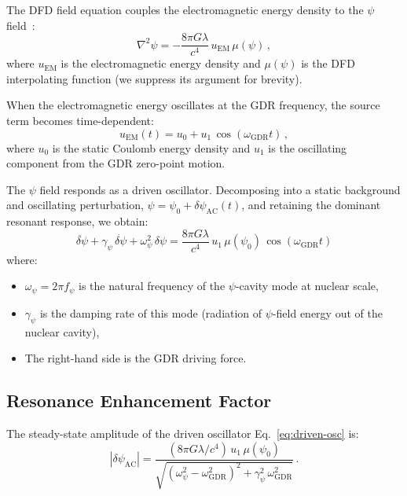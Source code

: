 \documentclass[aps,prd,twocolumn,superscriptaddress,nofootinbib]{revtex4-2}
\newcommand{\mufunction}{\mu}
\newcommand{\lam}{\lambda}
\newcommand{\wGDR}{\omega_{\mathrm{GDR}}}
\newcommand{\wpsi}{\omega_\psi}
\newcommand{\gpsi}{\gamma_\psi}
\newcommand{\fpsi}{f_\psi}
\begin{document}
The DFD field equation couples the electromagnetic energy density
to the $\psi$ field~\cite{Alcock2026Core}:
\begin{equation}\label{eq:field-eq}
\nabla^2\psi = -\frac{8\pi G\lam}{c^4}\,u_{\mathrm{EM}}\,
\mufunction(\psi)\,,
\end{equation}
where $u_{\mathrm{EM}}$ is the electromagnetic energy density and
$\mufunction(\psi)$ is the DFD interpolating function (we suppress
its argument for brevity).

When the electromagnetic energy oscillates at the GDR frequency, the
source term becomes time-dependent:
\begin{equation}\label{eq:uem-osc}
u_{\mathrm{EM}}(t) = u_0 + u_1\,\cos(\wGDR t)\,,
\end{equation}
where $u_0$ is the static Coulomb energy density and $u_1$ is the
oscillating component from the GDR zero-point motion.

The $\psi$ field responds as a driven oscillator.  Decomposing into
a static background and oscillating perturbation,
$\psi = \psi_0 + \delta\psi_{\mathrm{AC}}(t)$, and retaining the
dominant resonant response, we obtain:
\begin{equation}\label{eq:driven-osc}
\boxed{
\ddot{\delta\psi} + \gpsi\,\dot{\delta\psi} + \wpsi^2\,\delta\psi
= \frac{8\pi G\lam}{c^4}\,u_1\,\mufunction(\psi_0)\,
\cos(\wGDR t)
}
\end{equation}
where:
\begin{itemize}[nosep]
\item $\wpsi = 2\pi\fpsi$ is the natural frequency of the
$\psi$-cavity mode at nuclear scale,
\item $\gpsi$ is the damping rate of this mode (radiation of
$\psi$-field energy out of the nuclear cavity),
\item The right-hand side is the GDR driving force.
\end{itemize}

\subsection{Resonance Enhancement Factor}
\label{sec:Q-factor}

The steady-state amplitude of the driven oscillator
Eq.~\eqref{eq:driven-osc} is:
\begin{equation}\label{eq:amplitude}
|\delta\psi_{\mathrm{AC}}| =
\frac{(8\pi G\lam/c^4)\,u_1\,\mufunction(\psi_0)}
{\sqrt{(\wpsi^2 - \wGDR^2)^2 + \gpsi^2\,\wGDR^2}}\,.
\end{equation}
\end{document}
